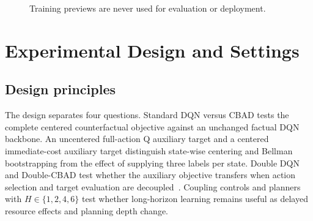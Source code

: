 \documentclass[11pt]{article}
\begin{document}
\begin{figure}[H]
\centering
{}
\par\smallskip
\caption*{Training previews are never used for evaluation or deployment.}
\label{alg:cbad}
\end{figure}

\section{Experimental Design and Settings}
\label{sec:experiments}

\subsection{Design principles}

The design separates four questions. Standard DQN versus CBAD tests the complete centered counterfactual objective against an unchanged factual DQN backbone. An uncentered full-action Q auxiliary target and a centered immediate-cost auxiliary target distinguish state-wise centering and Bellman bootstrapping from the effect of supplying three labels per state. Double DQN and Double-CBAD test whether the auxiliary objective transfers when action selection and target evaluation are decoupled~\cite{vanhasselt2016double}. Coupling controls and planners with $H\in\{1,2,4,6\}$ test whether long-horizon learning remains useful as delayed resource effects and planning depth change.
\end{document}
